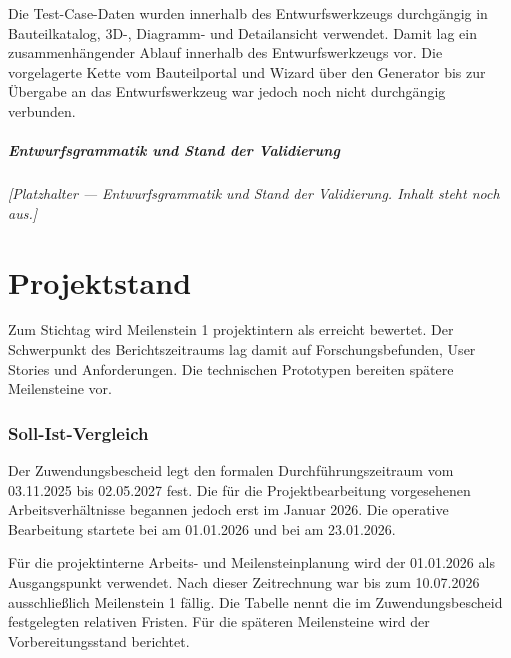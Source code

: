 \documentclass[type=zwischenbericht]{zukunftbau}
\begin{document}
Die Test-Case-Daten wurden innerhalb des Entwurfswerkzeugs durchgängig in Bauteilkatalog, 3D-, Diagramm- und Detailansicht verwendet. Damit lag ein zusammenhängender Ablauf innerhalb des Entwurfswerkzeugs vor. Die vorgelagerte Kette vom Bauteilportal und Wizard über den Generator bis zur Übergabe an das Entwurfswerkzeug war jedoch noch nicht durchgängig verbunden.

\subsubsection{Entwurfsgrammatik und Stand der Validierung}
\begin{Blockquote}
\textit{[Platzhalter --- Entwurfsgrammatik und Stand der Validierung. Inhalt steht noch aus.]}
\end{Blockquote}

\part{Projektstand}

Zum Stichtag wird Meilenstein 1 projektintern als erreicht bewertet. Der Schwerpunkt des Berichtszeitraums lag damit auf Forschungsbefunden, User Stories und Anforderungen. Die technischen Prototypen bereiten spätere Meilensteine vor.

\section{Soll-Ist-Vergleich}

Der Zuwendungsbescheid legt den formalen Durchführungszeitraum vom 03.11.2025 bis 02.05.2027 fest. Die für die Projektbearbeitung vorgesehenen Arbeitsverhältnisse begannen jedoch erst im Januar 2026. Die operative Bearbeitung startete bei  am 01.01.2026 und bei  am 23.01.2026.

Für die projektinterne Arbeits- und Meilensteinplanung wird der 01.01.2026 als Ausgangspunkt verwendet. Nach dieser Zeitrechnung war bis zum 10.07.2026 ausschließlich Meilenstein 1 fällig. Die Tabelle nennt die im Zuwendungsbescheid festgelegten relativen Fristen. Für die späteren Meilensteine wird der Vorbereitungsstand berichtet.
\end{document}
